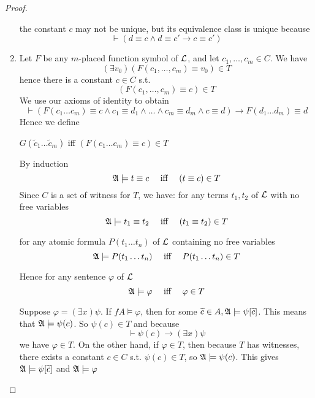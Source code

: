 \documentclass[11pt]{article}
\begin{document}
\begin{proof}
\begin{enumerate}
the constant \(c\) may not be unique, but its equivalence class is unique
 because
\begin{equation*}
\vdash(d\equiv c\wedge d\equiv c'\to c\equiv c')
\end{equation*}

\item Let \(F\) be any \(m\)-placed function symbol of \(\mathcal{L}\), and let
\(c_1,\dots,c_m\in C\). We have
\begin{equation*}
(\exists v_0)(F(c_1,\dots,c_m)\equiv v_0)\in T
\end{equation*}
hence there is a constant \(c\in C\) s.t.
\begin{equation*}
(F(c_1,\dots ,c_m)\equiv c)\in T
\end{equation*}
We use our axioms of identity to obtain
\begin{equation*}
\vdash (F(c_1\dots c_m)\equiv c\wedge
c_1\equiv d_1\wedge\dots\wedge c_m\equiv d_m\wedge c\equiv d)\to
F(d_1\dots d_m)\equiv d
\end{equation*}
Hence we define

\(G(\widetilde{c}_1\dots\widetilde{c}_m)\) iff
\((F(c_1\dots c_m)\equiv c)\in T\)

By induction
\begin{equation*}
\mathfrak{A}\models t\equiv c \quad\text{ iff }\quad
(t\equiv c)\in T
\end{equation*}
Since \(C\) is a set of witness for \(T\), we have: for any terms
\(t_1,t_2\) of \(\mathcal{L}\) with no free variables
\begin{equation*}
\mathfrak{A}\models t_1\equiv t_2 \quad\text{ iff }\quad
(t_1\equiv t_2)\in T
\end{equation*}

for any atomic formula \(P(t_1\dots t_n)\) of \(\mathcal{L}\) containing no free
variables
\begin{equation*}
\mathfrak{A}\models P(t_1\dots t_n) \quad\text{ iff }\quad
P(t_1\dots t_n)\in T
\end{equation*}

Hence for any sentence \(\varphi\) of \(\mathcal{L}\)
\begin{equation*}
\mathfrak{A}\models\varphi \quad\text{ iff }\quad
\varphi\in T
\end{equation*}

Suppose \(\varphi=(\exists x)\psi\). If \(fA\models\varphi\), then for
some \(\widetilde{c}\in A,\mathfrak{A}\models\psi[\widetilde{c}]\). This means that
\(\mathfrak{A}\models\psi(c)\). So \(\psi(c)\in T\) and because
\begin{equation*}
\vdash\psi(c)\to(\exists x)\psi
\end{equation*}
we have \(\varphi\in T\). On the other hand, if \(\varphi\in T\), then
because \(T\) has witnesses, there exists a constant \(c\in C\) s.t.
\(\psi(c)\in T\), so \(\mathfrak{A}\models\psi(c)\). This gives
\(\mathfrak{A}\models\psi[\widetilde{c}]\) and \(\mathfrak{A}\models\varphi\)
\end{enumerate}
\end{proof}
\end{document}
